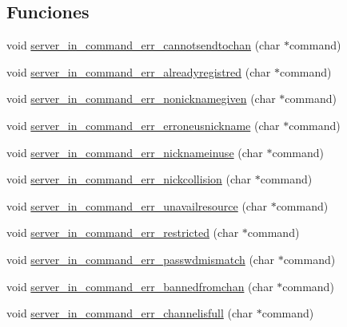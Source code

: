 \subsection*{Funciones}
\begin{DoxyCompactItemize}
\item 
void \hyperlink{G-2313-06-P2__client__err__handlers_8h_aee5973ae831d1c7c63b1a62b59f561c2}{server\+\_\+in\+\_\+command\+\_\+err\+\_\+cannotsendtochan} (char $\ast$command)
\item 
void \hyperlink{G-2313-06-P2__client__err__handlers_8h_a14bfb17eb95d0f2bef1869aa2ebf520c}{server\+\_\+in\+\_\+command\+\_\+err\+\_\+alreadyregistred} (char $\ast$command)
\item 
void \hyperlink{G-2313-06-P2__client__err__handlers_8h_aaa9cfb1b5050bd1218c227d8d0a041fe}{server\+\_\+in\+\_\+command\+\_\+err\+\_\+nonicknamegiven} (char $\ast$command)
\item 
void \hyperlink{G-2313-06-P2__client__err__handlers_8h_abeb8ead21ebba982eb59f161eda735cb}{server\+\_\+in\+\_\+command\+\_\+err\+\_\+erroneusnickname} (char $\ast$command)
\item 
void \hyperlink{G-2313-06-P2__client__err__handlers_8h_ab6d8f2d05566bf6ee9dfcfc4a20f5d23}{server\+\_\+in\+\_\+command\+\_\+err\+\_\+nicknameinuse} (char $\ast$command)
\item 
void \hyperlink{G-2313-06-P2__client__err__handlers_8h_a4af95b292b293c08c0989b4e7334c7eb}{server\+\_\+in\+\_\+command\+\_\+err\+\_\+nickcollision} (char $\ast$command)
\item 
void \hyperlink{G-2313-06-P2__client__err__handlers_8h_ae4fcb567dc7685f5d7a4abbc7c6506b4}{server\+\_\+in\+\_\+command\+\_\+err\+\_\+unavailresource} (char $\ast$command)
\item 
void \hyperlink{G-2313-06-P2__client__err__handlers_8h_ada432444f58d5effbb05fd558a8ce289}{server\+\_\+in\+\_\+command\+\_\+err\+\_\+restricted} (char $\ast$command)
\item 
void \hyperlink{G-2313-06-P2__client__err__handlers_8h_a548a7ad35236521dca4b829e466f3379}{server\+\_\+in\+\_\+command\+\_\+err\+\_\+passwdmismatch} (char $\ast$command)
\item 
void \hyperlink{G-2313-06-P2__client__err__handlers_8h_a0e4059ef132eaac2218fdd89b20ca852}{server\+\_\+in\+\_\+command\+\_\+err\+\_\+bannedfromchan} (char $\ast$command)
\item 
void \hyperlink{G-2313-06-P2__client__err__handlers_8h_a05db0aa32f2ec2925cba3b952435bf59}{server\+\_\+in\+\_\+command\+\_\+err\+\_\+channelisfull} (char $\ast$command)

\end{DoxyCompactItemize}
